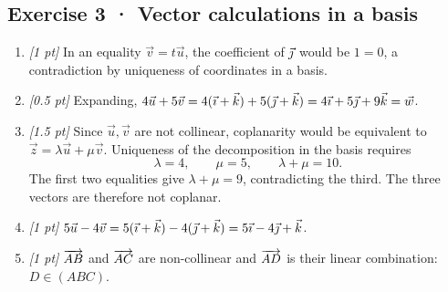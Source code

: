 \subsection*{Exercise 3 · Vector calculations in a basis}\begin{enumerate}

\item \textit{[1 pt]} In an equality $\vec v=t\vec u$, the coefficient of $\vec{\jmath} $ would be $1=0$, a contradiction by uniqueness of coordinates in a basis.

\item \textit{[0.5 pt]} Expanding, $4\vec u+5\vec v=4(\vec{\imath} +\vec k)+5(\vec{\jmath} +\vec k)=4\vec{\imath} +5\vec{\jmath} +9\vec k=\vec w$.

\item \textit{[1.5 pt]} Since $\vec u,\vec v$ are not collinear, coplanarity would be equivalent to $\vec z=\lambda\vec u+\mu\vec v$. Uniqueness of the decomposition in the basis requires
\[\lambda=4,\qquad\mu=5,\qquad\lambda+\mu=10.\]
The first two equalities give $\lambda+\mu=9$, contradicting the third. The three vectors are therefore not coplanar.

\item \textit{[1 pt]} $5\vec u-4\vec v=5(\vec{\imath} +\vec k)-4(\vec{\jmath} +\vec k)=5\vec{\imath} -4\vec{\jmath} +\vec k$.

\item \textit{[1 pt]} $\overrightarrow{AB}$ and $\overrightarrow{AC}$ are non-collinear and $\overrightarrow{AD}$ is their linear combination: $D\in(ABC)$.

\end{enumerate}


